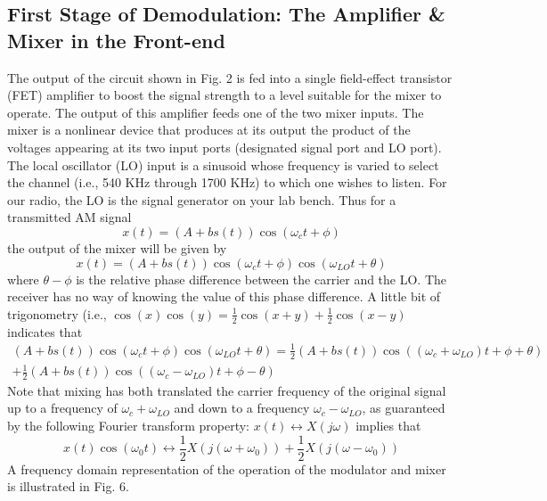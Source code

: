 \documentclass[12pt]{article}
\begin{document}
\subsection{First Stage of Demodulation: The Amplifier \& Mixer in the Front-end}
The output of the circuit shown in Fig. 2 is fed into a single field-effect transistor (FET) amplifier to
boost the signal strength to a level suitable for the mixer to operate. The output of this amplifier feeds one
of the two mixer inputs. The mixer is a nonlinear device that produces at its output the product of the
voltages appearing at its two input ports (designated signal port and LO port). The local oscillator (LO)
input is a sinusoid whose frequency is varied to select the channel (i.e., 540 KHz through 1700 KHz) to which
one wishes to listen. For our radio, the LO is the signal generator on your lab bench. Thus for a transmitted
AM signal
\begin{equation}
x(t)=(A+bs(t))\cos(\omega_c t+\phi)
\end{equation}
the output of the mixer will be given by
\begin{equation}
x(t)=(A+bs(t))\cos(\omega_c t+\phi)\cos(\omega_{LO}t+\theta)
\end{equation}
where $\theta-\phi$ is the relative phase difference between the carrier and the LO. The receiver has no way of knowing
the value of this phase difference. A little bit of trigonometry (i.e., $\cos(x)\cos(y)=\frac{1}{2}\cos(x+y)+\frac{1}{2}\cos(x-y)$
indicates that
\begin{equation}
\begin{aligned}
(A+bs(t))\cos(\omega_c t+\phi)\cos(\omega_{LO}t+\theta)=\frac{1}{2}(A+bs(t))\cos((\omega_c+\omega_{LO})t+\phi+\theta)
\\+ \frac{1}{2}(A+bs(t))\cos((\omega_c-\omega_{LO})t+\phi-\theta)
\end{aligned}
\end{equation}
Note that mixing has both translated the carrier frequency of the original signal up to a frequency of $\omega_c+\omega_{LO}$
and down to a frequency $\omega_c-\omega_{LO}$, as guaranteed by the following Fourier transform property: $x(t)\leftrightarrow X(j\omega)$
implies that
\begin{equation}
x(t)\cos(\omega_0 t)\leftrightarrow\frac{1}{2}X(j(\omega+\omega_0))+\frac{1}{2}X(j(\omega-\omega_0))
\end{equation}
A frequency domain representation of the operation of the modulator and mixer is illustrated in Fig. 6.
\end{document}
